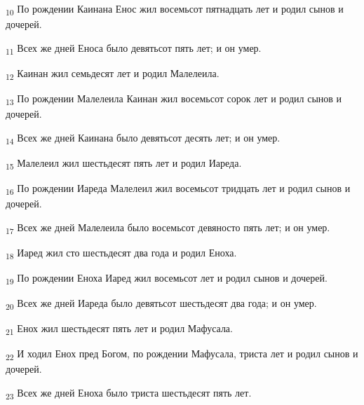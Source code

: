 \begin{tcolorbox}
\textsubscript{10} По рождении Каинана Енос жил восемьсот пятнадцать лет и родил сынов и дочерей.
\end{tcolorbox}
\begin{tcolorbox}
\textsubscript{11} Всех же дней Еноса было девятьсот пять лет; и он умер.
\end{tcolorbox}
\begin{tcolorbox}
\textsubscript{12} Каинан жил семьдесят лет и родил Малелеила.
\end{tcolorbox}
\begin{tcolorbox}
\textsubscript{13} По рождении Малелеила Каинан жил восемьсот сорок лет и родил сынов и дочерей.
\end{tcolorbox}
\begin{tcolorbox}
\textsubscript{14} Всех же дней Каинана было девятьсот десять лет; и он умер.
\end{tcolorbox}
\begin{tcolorbox}
\textsubscript{15} Малелеил жил шестьдесят пять лет и родил Иареда.
\end{tcolorbox}
\begin{tcolorbox}
\textsubscript{16} По рождении Иареда Малелеил жил восемьсот тридцать лет и родил сынов и дочерей.
\end{tcolorbox}
\begin{tcolorbox}
\textsubscript{17} Всех же дней Малелеила было восемьсот девяносто пять лет; и он умер.
\end{tcolorbox}
\begin{tcolorbox}
\textsubscript{18} Иаред жил сто шестьдесят два года и родил Еноха.
\end{tcolorbox}
\begin{tcolorbox}
\textsubscript{19} По рождении Еноха Иаред жил восемьсот лет и родил сынов и дочерей.
\end{tcolorbox}
\begin{tcolorbox}
\textsubscript{20} Всех же дней Иареда было девятьсот шестьдесят два года; и он умер.
\end{tcolorbox}
\begin{tcolorbox}
\textsubscript{21} Енох жил шестьдесят пять лет и родил Мафусала.
\end{tcolorbox}
\begin{tcolorbox}
\textsubscript{22} И ходил Енох пред Богом, по рождении Мафусала, триста лет и родил сынов и дочерей.
\end{tcolorbox}
\begin{tcolorbox}
\textsubscript{23} Всех же дней Еноха было триста шестьдесят пять лет.
\end{tcolorbox}
